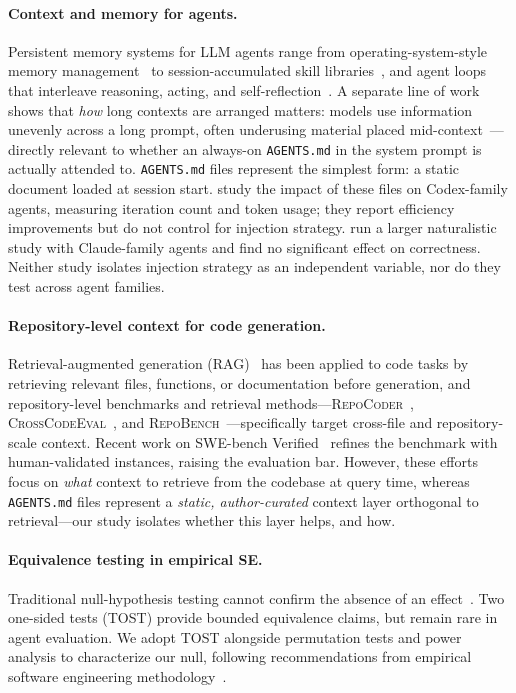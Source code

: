 \documentclass[11pt]{article}
\newcommand{\agentsmd}{\texttt{AGENTS.md}}
\begin{document}
\paragraph{Context and memory for agents.}
Persistent memory systems for LLM agents range from operating-system-style memory management~\citep{memgpt} to session-accumulated skill libraries~\citep{voyager}, and agent loops that interleave reasoning, acting, and self-reflection~\citep{react,reflexion}.
A separate line of work shows that \emph{how} long contexts are arranged matters: models use information unevenly across a long prompt, often underusing material placed mid-context~\citep{lostinthemiddle}---directly relevant to whether an always-on \agentsmd{} in the system prompt is actually attended to.
\agentsmd{} files represent the simplest form: a static document loaded at session start.
\citet{paper1} study the impact of these files on Codex-family agents, measuring iteration count and token usage; they report efficiency improvements but do not control for injection strategy.
\citet{paper2} run a larger naturalistic study with Claude-family agents and find no significant effect on correctness.
Neither study isolates injection strategy as an independent variable, nor do they test across agent families.

\paragraph{Repository-level context for code generation.}
Retrieval-augmented generation (RAG)~\citep{rag} has been applied to code tasks by retrieving relevant files, functions, or documentation before generation, and repository-level benchmarks and retrieval methods---\textsc{RepoCoder}~\citep{repocoder}, \textsc{CrossCodeEval}~\citep{crosscodeeval}, and \textsc{RepoBench}~\citep{repobench}---specifically target cross-file and repository-scale context.
Recent work on SWE-bench Verified~\citep{swebenchverified} refines the benchmark with human-validated instances, raising the evaluation bar.
However, these efforts focus on \emph{what} context to retrieve from the codebase at query time, whereas \agentsmd{} files represent a \emph{static, author-curated} context layer orthogonal to retrieval---our study isolates whether this layer helps, and how.

\paragraph{Equivalence testing in empirical SE.}
Traditional null-hypothesis testing cannot confirm the absence of an effect~\citep{tost}.
Two one-sided tests (TOST) provide bounded equivalence claims, but remain rare in agent evaluation.
We adopt TOST alongside permutation tests and power analysis to characterize our null, following recommendations from empirical software engineering methodology~\citep{empiricalse}.
\end{document}

